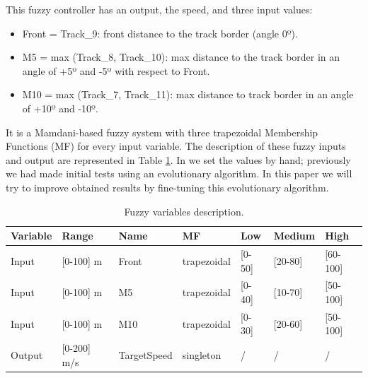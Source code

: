 \documentclass[conference]{IEEEtran}
\begin{document}
This fuzzy controller has an output, the speed, and three input values:
\begin{itemize}
	\item Front = Track\_9: front distance to the track border (angle 0º).  %
	\item M5 = max (Track\_8, Track\_10): max distance to the track border in an angle of +5º and -5º with respect to Front.
	\item M10 = max (Track\_7, Track\_11): max distance to track border in an angle of +10º and -10º.
\end{itemize}

It is a Mamdani-based fuzzy system \cite{iancu2012} with three
trapezoidal Membership Functions (MF) for every input variable. The
description of these fuzzy inputs and output are represented in Table
\ref{tab:flouevar}. In \cite{evo17} we set the values by hand;
previously we had made initial tests using an evolutionary
algorithm. In this paper we will try to improve obtained results by
fine-tuning this evolutionary algorithm. %

\begin{table}
	\centering
	{\scriptsize
		\caption{Fuzzy variables description.}
		\label{tab:flouevar}
		\begin{tabular}{ |p{1.5cm}|p{2cm}|p{2cm}|p{2 cm}|p{1 cm}|p{1.5 cm}|p{1.5 cm}|}
			\hline
			{ \textbf{Variable}}&
			{ \textbf{Range}}&
			{ \textbf{Name}}&  
			{ \textbf{MF}} &
			{ \textbf{Low}} &
			{ \textbf{Medium}}&
			{ \textbf{High}} \\
			\hline
			Input & [0-100] m & Front & trapezoidal & [0-50] & [20-80] & [60-100]
			\\
			\hline
			Input & [0-100] m & M5 & trapezoidal &[0-40] & [10-70] & [50-100] 
			\\
			\hline
			Input & [0-100] m  & M10 & trapezoidal & [0-30] & [20-60] & [50-100]
			\\
			\hline 
			Output & [0-200] m/s & TargetSpeed & singleton & / & / & /
			\\
			\hline 
		\end{tabular} 
	}
\end{table}
\end{document}
